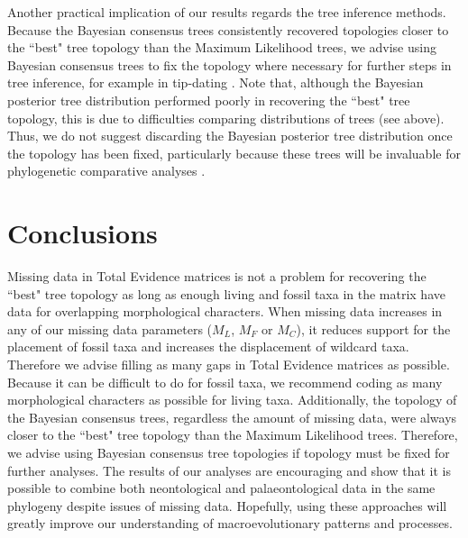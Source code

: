 \documentclass[12pt,letterpaper]{article}
\begin{document}
Another practical implication of our results regards the tree inference methods.
Because the Bayesian consensus trees consistently recovered topologies closer to the ``best" tree topology than the Maximum Likelihood trees, we advise using Bayesian consensus trees to fix the topology where necessary for further steps in tree inference, for example in tip-dating \citep[][; although it is possible that including dating information during tree inference could improve the accuracy of the Bayesian posterior tree distribution]{ronquista2012,BEASTmaster}.
Note that, although the Bayesian posterior tree distribution performed poorly in recovering the ``best" tree topology, this is due to difficulties comparing distributions of trees (see above).
Thus, we do not suggest discarding the Bayesian posterior tree distribution once the topology has been fixed, particularly because these trees will be invaluable for phylogenetic comparative analyses \citep[e.g.][]{jetzthe2012}.

\section{Conclusions}
Missing data in Total Evidence matrices is not a problem for recovering the ``best" tree topology as long as enough living and fossil taxa in the matrix have data for overlapping morphological characters.
When missing data increases in any of our missing data parameters ($M_{L}$, $M_{F}$ or $M_{C}$), it reduces support for the placement of fossil taxa and increases the displacement of wildcard taxa.
Therefore we advise filling as many gaps in Total Evidence matrices as possible.
Because it can be difficult to do for fossil taxa, we recommend coding as many morphological characters as possible for living taxa.
Additionally, the topology of the Bayesian consensus trees, regardless the amount of missing data, were always closer to the ``best" tree topology than the Maximum Likelihood trees.
Therefore, we advise using Bayesian consensus tree topologies if topology must be fixed for further analyses.
The results of our analyses are encouraging and show that it is possible to combine both neontological and palaeontological data in the same phylogeny despite issues of missing data.
Hopefully, using these approaches will greatly improve our understanding of macroevolutionary patterns and processes.

\end{document}
